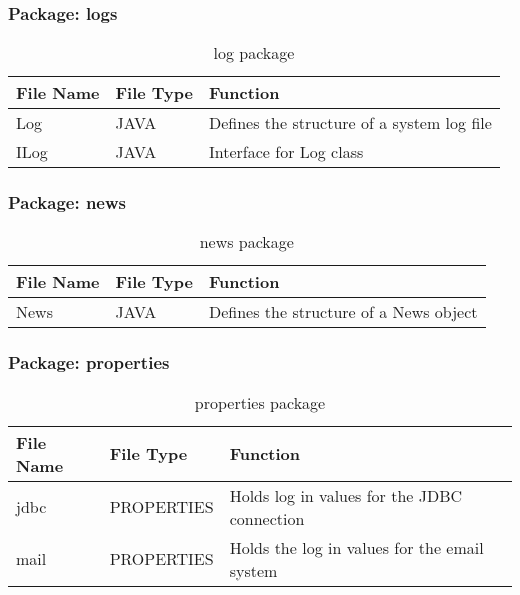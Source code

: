 \subsubsection{Package: logs}
\begin{table}[H]
\begin{center}
    \begin{tabular}{| l | l | p{5cm} |}
    \hline
    File Name & File Type & Function\\ \hline
    Log & JAVA & Defines the structure of a system log file\\ \hline
	ILog & JAVA & Interface for Log class\\ \hline
    \end{tabular}
\end{center}
\caption{log package}
\end{table}

\subsubsection{Package: news}
\begin{table}[H]
\begin{center}
    \begin{tabular}{| l | l | p{5cm} |}
    \hline
    File Name & File Type & Function\\ \hline
    News & JAVA & Defines the structure of a News object\\ \hline
    \end{tabular}
\end{center}
\caption{news package}
\end{table}

\subsubsection{Package: properties}
\begin{table}[H]
\begin{center}
    \begin{tabular}{| l | l | p{5cm} |}
    \hline
    File Name & File Type & Function\\ \hline
    jdbc & PROPERTIES & Holds log in values for the JDBC connection\\ \hline
	mail & PROPERTIES & Holds the log in values for the email system\\ \hline
    \end{tabular}
\end{center}
\caption{properties package}
\end{table}

